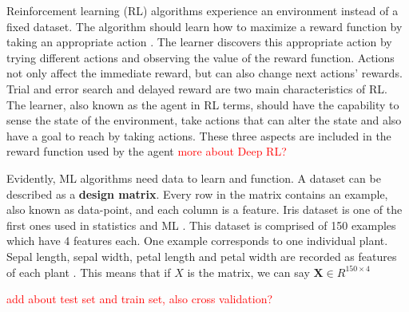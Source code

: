 Reinforcement learning (RL) algorithms experience an environment instead of a fixed dataset. The algorithm should learn how to maximize a reward function by taking an appropriate action \cite{sutton1992introduction}. The learner discovers this appropriate action by trying different actions and observing the value of the reward function. Actions not only affect the immediate reward, but can also change next actions' rewards. Trial and error search and delayed reward are two main characteristics of RL.\\The learner, also known as the agent in RL terms, should have the capability to sense the state of the environment, take actions that can alter the state and also have a goal to reach by taking actions. These three aspects are included in the reward function used by the agent \cite{sutton1992introduction} \textcolor{red}{more about Deep RL?}

Evidently, ML algorithms need data to learn and function. A dataset can be described as a \textbf{design matrix}. Every row in the matrix contains an example, also known as data-point, and each column is a feature. Iris dataset is one of the first ones used in statistics and ML \cite{Fischer1936Iris}. This dataset is comprised of 150 examples which have 4 features each. One example corresponds to one individual plant. Sepal length, sepal width, petal length and petal width are recorded as features of each plant \cite{Fischer1936Iris}.
This means that if $X$ is the matrix, we can say $\mathbf{X} \in R^{150 \times 4}$

\textcolor{red}{add about test set and train set, also cross validation?}\\